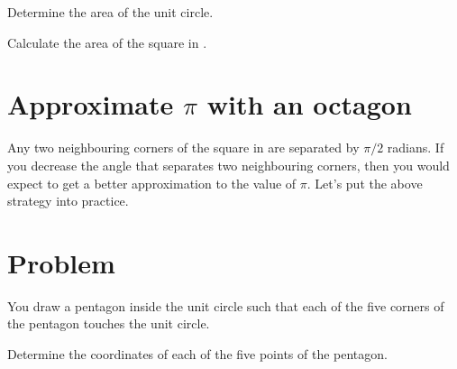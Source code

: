 \documentclass[a4paper,oneside,12pt]{article}
\begin{document}
\begin{exercise}
Determine the area of the unit circle.
\end{exercise}


\begin{exercise}
Calculate the area of the square in
.
\end{exercise}




\section{Approximate $\pi$ with an octagon}

Any two neighbouring corners of the square in
 are separated by $\pi / 2$
radians.  If you decrease the angle that separates two neighbouring
corners, then you would expect to get a better approximation to the
value of $\pi$.  Let's put the above strategy into practice.



\section*{Problem}

\begin{problem}
\item You draw a pentagon inside the unit circle such that each of the
  five corners of the pentagon touches the unit circle.
  \begin{packedenum}
  \item Determine the coordinates of each of the five points of the
    pentagon.
  \end{packedenum}
\end{problem}
\end{document}
